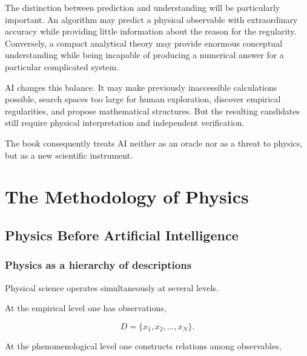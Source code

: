 \documentclass[11pt,a4paper,oneside]{book}
\begin{document}
The distinction between prediction and understanding will be particularly
important. An algorithm may predict a physical observable with extraordinary
accuracy while providing little information about the reason for the
regularity. Conversely, a compact analytical theory may provide enormous
conceptual understanding while being incapable of producing a numerical answer
for a particular complicated system.

AI changes this balance. It may make previously inaccessible calculations
possible, search spaces too large for human exploration, discover empirical
regularities, and propose mathematical structures. But the resulting candidates
still require physical interpretation and independent verification.

The book consequently treats AI neither as an oracle nor as a threat to
physics, but as a new scientific instrument.

\tableofcontents

\listoffigures
\listoftables

\mainmatter

\part{The Methodology of Physics}

\chapter{Physics Before Artificial Intelligence}
\label{chap:before-ai}

\section{Physics as a hierarchy of descriptions}

Physical science operates simultaneously at several levels.

At the empirical level one has observations,

\begin{equation}
D=\{x_1,x_2,\ldots,x_N\}.
\end{equation}

At the phenomenological level one constructs relations among observables,
\end{document}
